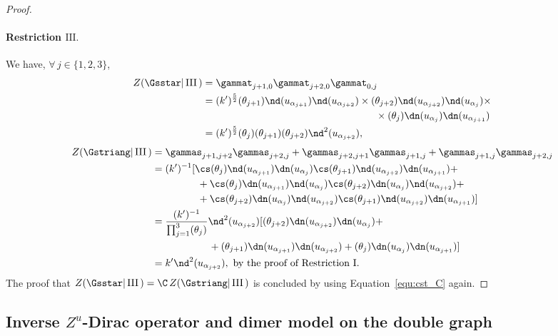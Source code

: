 \documentclass[a4paper,twoside,11pt]{article}
\begin{document}
\begin{proof}
\paragraph{Restriction $\mathrm{III}.$}
We have, $\forall\,j\in\{1,2,3\}$,
\begin{align*}
Z(\Gsstar|\,\mathrm{III}\,)&=\gammat_{j+1,0}\gammat_{j+2,0}\gammat_{0,j}\\
&=(k')^{\frac{5}{2}}\sc(\theta_{j+1})\nd(u_{\alpha_{j+1}})\nd(u_{\alpha_{j+2}})\times
\sc(\theta_{j+2})\nd(u_{\alpha_{j+2}})\nd(u_{\alpha_j})\times \\
&\hspace{6.1cm} \times \sc(\theta_j) \dn(u_{\alpha_j})\dn(u_{\alpha_{j+1}})\\
&=(k')^{\frac{5}{2}}\sc(\theta_j)\sc(\theta_{j+1})\sc(\theta_{j+2})\nd^2(u_{\alpha_{j+2}}),
\end{align*}
\begin{align*}
Z(\Gstriang|\,\mathrm{III}\,)&=\gammas_{j+1,j+2}\gammas_{j+2,j}+\gammas_{j+2,j+1}\gammas_{j+1,j}+
\gammas_{j+1,j}\gammas_{j+2,j}\\
&=(k')^{-1}[\cs(\theta_j)\nd(u_{\alpha_{j+1}})\dn(u_{\alpha_j})\cs(\theta_{j+1})\nd(u_{\alpha_{j+2}})\dn(u_{\alpha_{j+1}})+\\
&\hspace{1.6cm}  +\cs(\theta_j)\dn(u_{\alpha_{j+1}})\nd(u_{\alpha_j})   \cs(\theta_{j+2})\dn(u_{\alpha_j})\nd(u_{\alpha_{j+2}})+\\
&\hspace{1.6cm}  +\cs(\theta_{j+2})\dn(u_{\alpha_{j}})\nd(u_{\alpha_{j+2}}) \cs(\theta_{j+1})\nd(u_{\alpha_{j+2}})\dn(u_{\alpha_{j+1}})]\\
&=\frac{(k')^{-1}}{\prod_{j=1}^3 \sc(\theta_j)}\nd^2(u_{\alpha_{j+2}})
[\sc(\theta_{j+2})\dn(u_{\alpha_{j+2}}) \dn(u_{\alpha_j}) +\\
&\hspace{2cm}+ \sc(\theta_{j+1})\dn(u_{\alpha_{j+1}}) \dn(u_{\alpha_{j+2}}) +
\sc(\theta_{j})\dn(u_{\alpha_{j}}) \dn(u_{\alpha_{j+1}})
]\\
&=k'\nd^2(u_{\alpha_{j+2}}),\text{ by the proof of Restriction I}.
\end{align*}
The proof that $Z(\Gsstar|\,\mathrm{III}\,)=\C\, Z(\Gstriang|\,\mathrm{III}\,)$ is concluded by using Equation~\eqref{equ:cst_C} again. 
\end{proof}




\subsection{Inverse $Z^u$-Dirac operator and dimer model on the double graph}\label{sec:KD_Lap_inv}
\end{document}
